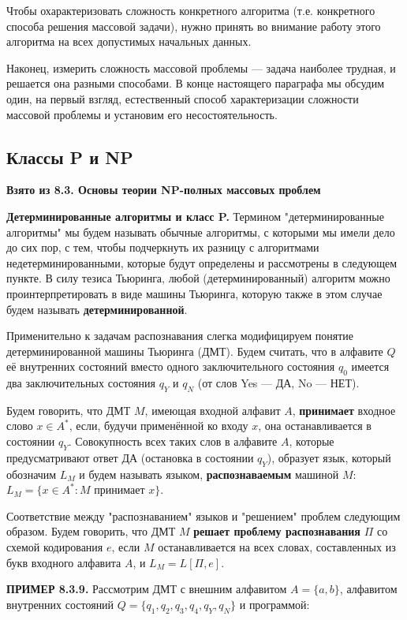 \documentclass[a4paper,12pt]{article}
\begin{document}
Чтобы охарактеризовать сложность конкретного алгоритма (т.е. конкретного способа решения массовой задачи), нужно принять во внимание работу этого алгоритма на всех допустимых начальных данных.

Наконец, измерить сложность массовой проблемы --- задача наиболее трудная, и решается она разными способами. В конце настоящего параграфа мы обсудим один, на первый взгляд, естественный способ характеризации сложности массовой проблемы и установим его несостоятельность.

\subsection{Классы P и NP}

\textbf{Взято из 8.3. Основы теории NP-полных массовых проблем}

\textbf{Детерминированные алгоритмы и класс P.} Термином "детерминированные алгоритмы" мы будем называть обычные алгоритмы, с которыми мы имели дело до сих пор, с тем, чтобы подчеркнуть их разницу с алгоритмами недетерминированными, которые будут определены и рассмотрены в следующем пункте. В силу тезиса Тьюринга, любой (детерминированный) алгоритм можно проинтерпретировать в виде машины Тьюринга, которую также в этом случае будем называть \textbf{детерминированной}.

Применительно к задачам распознавания слегка модифицируем понятие детерминированной машины Тьюринга (ДМТ). Будем считать, что в алфавите \(Q\) её внутренних состояний вместо одного заключительного состояния \(q_0\) имеется два заключительных состояния \(q_Y\) и \(q_N\) (от слов Yes --- ДА, No --- НЕТ).

Будем говорить, что ДМТ \(M\), имеющая входной алфавит \(A\), \textbf{принимает} входное слово \(x \in A^*\), если, будучи применённой ко входу \(x\), она останавливается в состоянии \(q_Y\). Совокупность всех таких слов в алфавите \(A\), которые предусматривают ответ ДА (остановка в состоянии \(q_Y\)), образует язык, который обозначим \(L_M\) и будем называть языком, \textbf{распознаваемым} машиной \(M\): \(L_M = \{x \in A^* : M \text{ принимает } x\}\).

Соответствие между "распознаванием" языков и "решением" проблем следующим образом. Будем говорить, что ДМТ \(M\) \textbf{решает проблему распознавания} \(\Pi\) со схемой кодирования \(e\), если \(M\) останавливается на всех словах, составленных из букв входного алфавита \(A\), и \(L_M = L[\Pi, e]\).

\textbf{ПРИМЕР 8.3.9.} Рассмотрим ДМТ с внешним алфавитом \(A = \{a, b\}\), алфавитом внутренних состояний \(Q = \{q_1, q_2, q_3, q_4, q_Y, q_N\}\) и программой:
\end{document}
